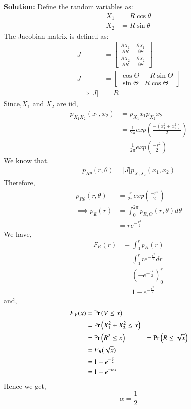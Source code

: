 \documentclass[journal,12pt,twocolumn]{IEEEtran}
\renewcommand\thesection{\arabic{section}}
\begin{document}
\begin{enumerate}[label=\thesection.\arabic*
,ref=\thesection.\theenumi]
\textbf{Solution:}
Define the random variables as:
\begin{align}
X_1&=R\cos\theta\\
X_2&=R\sin\theta
\end{align}
The Jacobian matrix is defined as:
\begin{align}
    J &= \begin{bmatrix}
        \frac{\partial X_1}{\partial R} & \frac{\partial X_1}{\partial \Theta} \\
        \frac{\partial X_2}{\partial R} & \frac{\partial X_2}{\partial \Theta}
    \end{bmatrix} \\
    J &= \begin{bmatrix}
        \cos \Theta & -R \sin \Theta \\
        \sin \Theta & R \cos \Theta
    \end{bmatrix} \\
    \implies |J| &= R 
\end{align}
Since,$X_1$ and $X_2$ are iid,
\begin{align}
    p_{X_1 X_2}(x_1,x_2)&=p_{X_1}x_1 p_{X_2}x_2\\
    &=\frac{1}{2\pi}exp(\frac{-(x_1^2 +x_2^2)}{2})\\
    &=\frac{1}{2\pi}exp(\frac{-r^2}{2})
\end{align}
We know that,
\begin{align}
    p_{R\theta}{(r,\theta)}=|J|p_{X_1 X_2}(x_1,x_2)
\end{align}
Therefore,
\begin{align}
    p_{R\theta}{(r,\theta)}&=\frac{r}{2\pi}exp(\frac{-r^2}{2})\\
    \implies p_{R}(r) &= \int_{0}^{2 \pi} p_{R, \Theta}(r, \theta) d \theta \\
            &= r e^{-{\frac{r^2}{2}}}
\end{align}
We have,
\begin{align}
    F_R(r) &= \int_{0}^{r} p_R(r) \\
    &= \int_{0}^{r} r e^{-\frac{r^2}{2}} dr \\
    &= \left(-e^{-\frac{r^2}{2}}\right)_{0}^{r} \\
    &= 1 - e^{-\frac{r^2}{2}}
\end{align}
and,
\begin{align}
    F_V(x) &= \Pr\left(V \leq x\right) \\
    &= \Pr\left(X_1^2 + X_2^2 \leq x\right) \\
    &= \Pr\left(R^2 \leq x\right)
    &= \Pr\left(R \leq \sqrt{x}\right) \\
    &= F_R(\sqrt{x}) \\
    &= 1 - e^{-\frac{x}{2}} \\
    &= 1 - e^{- \alpha x}
\end{align}
Hence we get,
        \begin{equation}
            \alpha = \frac{1}{2}
        \end{equation}




\end{enumerate}
\end{document}
